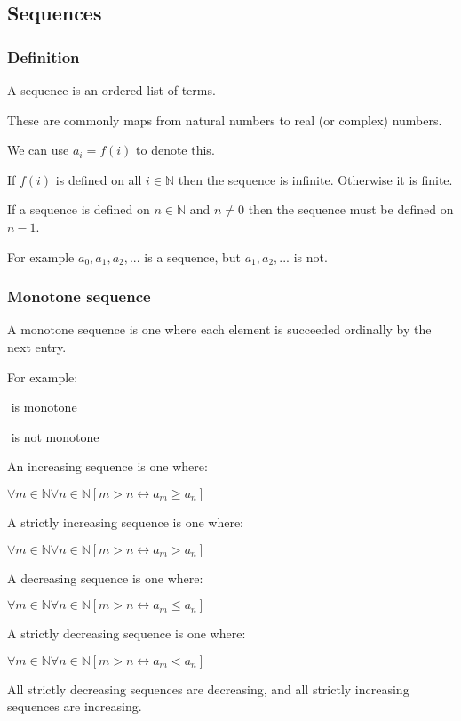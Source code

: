 
\subsection{Sequences}

\subsubsection{Definition}

A sequence is an ordered list of terms.

These are commonly maps from natural numbers to real (or complex) numbers.

We can use \(a_i=f(i)\) to denote this.

If \(f(i)\) is defined on all \(i\in \mathbb{N}\) then the sequence is infinite. Otherwise it is finite.

If a sequence is defined on \(n\in \mathbb{N}\) and \(n\ne 0\) then the sequence must be defined on \(n-1\).

For example \(a_0, a_1, a_2,...\) is a sequence, but \(a_1,a_2,...\) is not.

\subsubsection{Monotone sequence}

A monotone sequence is one where each element is succeeded ordinally by the next entry.

For example:

\(<1,2,3,6,7>\) is monotone

\(<1,2,3,3,4>\) is not monotone

An increasing sequence is one where:

\(\forall m \in \mathbb{N} \forall n\in \mathbb{N} [m > n \leftrightarrow a_m \ge a_n]\)

A strictly increasing sequence is one where:

\(\forall m \in \mathbb{N} \forall n\in \mathbb{N} [m > n \leftrightarrow a_m > a_n]\)

A decreasing sequence is one where:

\(\forall m \in \mathbb{N} \forall n\in \mathbb{N} [m > n \leftrightarrow a_m \le a_n]\)

A strictly decreasing sequence is one where:

\(\forall m \in \mathbb{N} \forall n\in \mathbb{N} [m > n \leftrightarrow a_m < a_n]\)

All strictly decreasing sequences are decreasing, and all strictly increasing sequences are increasing.

